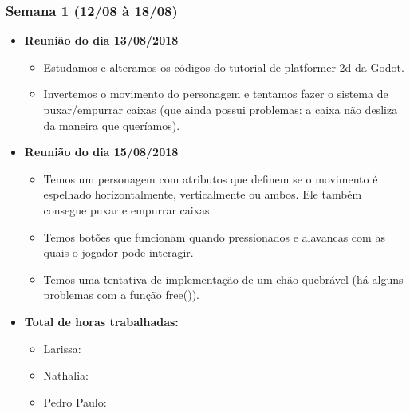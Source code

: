 \documentclass[a4paper, 11pt]{article}
\begin{document}
	\subsubsection{Semana 1 (12/08 à 18/08)}
		\begin{itemize} 
	 		\item \textbf{Reunião do dia 13/08/2018}

	 		\begin{itemize}
	   			\item Estudamos e alteramos os códigos do tutorial de platformer 2d da Godot.
	    		\item Invertemos o movimento do personagem e tentamos fazer o sistema de puxar/empurrar caixas (que ainda possui problemas: a caixa não desliza da maneira que queríamos).
	    	\end{itemize}

			\item \textbf{Reunião do dia 15/08/2018}

			\begin{itemize}
	    		\item Temos um personagem com atributos que definem se o movimento é espelhado horizontalmente, verticalmente ou ambos. Ele também consegue puxar e empurrar caixas.
	    		\item Temos botões que funcionam quando pressionados e alavancas com as quais o jogador pode interagir.
	    		\item Temos uma tentativa de implementação de um chão quebrável (há alguns problemas com a função free()).
	    	\end{itemize}

	    	\item \textbf{Total de horas trabalhadas:}
	    		\begin{itemize}
	    			\item Larissa:
	    			\item Nathalia:
	    			\item Pedro Paulo:
	    		\end{itemize}

	  	\end{itemize}
\end{document}

